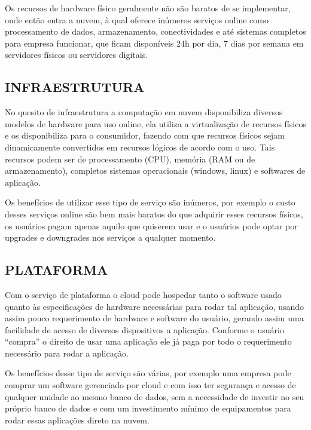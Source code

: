 \begin{justify}
    Os recursos de hardware físico geralmente não são baratos de se implementar, onde então
    entra a nuvem, à qual oferece inúmeros serviços online como processamento de dados,
    armazenamento, conectividades e até sistemas completos para empresa funcionar, que
    ficam disponíveis 24h por dia, 7 dias por semana em servidores físicos ou servidores
    digitais. \cite{rashid2019cloud}

    \subsection{INFRAESTRUTURA}
    No quesito de infraestrutura a computação em nuvem disponibiliza diversos modelos de
    hardware para uso online, ela utiliza a virtualização de recursos físicos e os disponibiliza
    para o consumidor, fazendo com que recursos físicos sejam dinamicamente convertidos em
    recursos lógicos de acordo com o uso. Tais recursos podem ser de processamento (CPU),
    memória (RAM ou de armazenamento), completos sistemas operacionais (windows, linux) e
    softwares de aplicação. \cite{pedrosa2011computaccao}

    Os benefícios de utilizar esse tipo de serviço são inúmeros, por exemplo o custo desses
    serviços online são bem mais baratos do que adquirir esses recursos físicos, os usuários
    pagam apenas aquilo que quiserem usar e o usuários pode optar por upgrades e
    downgrades nos serviços a qualquer momento.

    \subsection{PLATAFORMA}
    Com o serviço de plataforma o cloud pode hospedar tanto o software usado quanto às
    especificações de hardware necessárias para rodar tal aplicação, usando assim pouco
    requerimento de hardware e software do usuário, gerando assim uma facilidade de acesso
    de diversos dispositivos a aplicação. Conforme o usuário “compra” o direito de usar uma
    aplicação ele já paga por todo o requerimento necessário para rodar a aplicação.

    Os benefícios desse tipo de serviço são várias, por exemplo uma empresa pode comprar
    um software gerenciado por cloud e com isso ter segurança e acesso de qualquer unidade
    ao mesmo banco de dados, sem a necessidade de investir no seu próprio banco de dados e
    com um investimento mínimo de equipamentos para rodar essas aplicações direto na
    nuvem.\cite{rashid2019cloud}


\end{justify}
